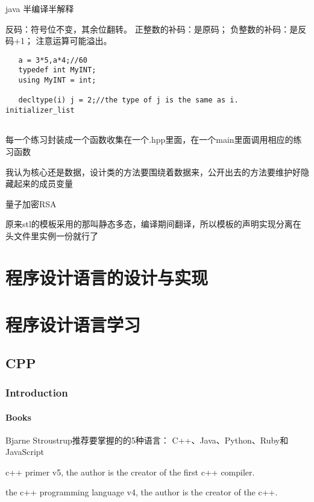 \documentclass[UTF8]{../computerUniverse}
\begin{document}
java 半编译半解释

反码：符号位不变，其余位翻转。
正整数的补码：是原码；
负整数的补码：是反码+1；
注意运算可能溢出。

\begin{lstlisting}
   a = 3*5,a*4;//60
   typedef int MyINT;
   using MyINT = int;

   decltype(i) j = 2;//the type of j is the same as i.
initializer_list


 \end{lstlisting}

 每一个练习封装成一个函数收集在一个.hpp里面，在一个main里面调用相应的练习函数

 我认为核心还是数据，设计类的方法要围绕着数据来，公开出去的方法要维护好隐藏起来的成员变量

 量子加密RSA

 原来stl的模板采用的那叫静态多态，编译期间翻译，所以模板的声明实现分离在头文件里实例一份就行了





\chapter{程序设计语言的设计与实现}




\chapter{程序设计语言学习}




\section{CPP}

\subsection{Introduction}


\subsubsection{Books}


Bjarne Stroustrup推荐要掌握的的5种语言：
C++、Java、Python、Ruby和JavaScript


c++ primer v5, the author is the creator of the first c++ compiler.

the c++ programming language v4, the author is the creator of the c++.
\end{document}
